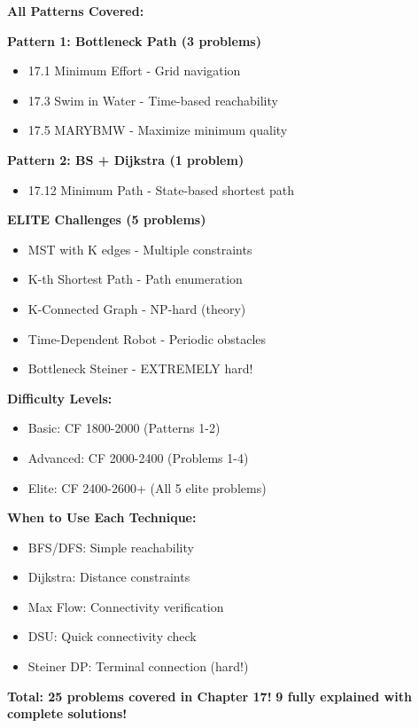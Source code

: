 \documentclass[11pt,a4paper,oneside]{book}
\begin{document}
\begin{tcolorbox}[
    enhanced,breakable,
    colback=primaryblue!10,
    colframe=primaryblue,
    boxrule=2pt,
    arc=4mm,
    title=\textbf{Binary Search on Graphs: Complete Mastery}
]
\textbf{All Patterns Covered:}

\textbf{Pattern 1: Bottleneck Path (3 problems)}
\begin{itemize}
\item 17.1 Minimum Effort - Grid navigation
\item 17.3 Swim in Water - Time-based reachability
\item 17.5 MARYBMW - Maximize minimum quality
\end{itemize}

\textbf{Pattern 2: BS + Dijkstra (1 problem)}
\begin{itemize}
\item 17.12 Minimum Path - State-based shortest path
\end{itemize}

\textbf{ELITE Challenges (5 problems)}
\begin{itemize}
\item MST with K edges - Multiple constraints
\item K-th Shortest Path - Path enumeration
\item K-Connected Graph - NP-hard (theory)
\item Time-Dependent Robot - Periodic obstacles
\item Bottleneck Steiner - EXTREMELY hard!
\end{itemize}

\textbf{Difficulty Levels:}
\begin{itemize}
\item Basic: CF 1800-2000 (Patterns 1-2)
\item Advanced: CF 2000-2400 (Problems 1-4)
\item Elite: CF 2400-2600+ (All 5 elite problems)
\end{itemize}

\textbf{When to Use Each Technique:}
\begin{itemize}
\item BFS/DFS: Simple reachability
\item Dijkstra: Distance constraints
\item Max Flow: Connectivity verification
\item DSU: Quick connectivity check
\item Steiner DP: Terminal connection (hard!)
\end{itemize}

\textbf{Total: 25 problems covered in Chapter 17!}
\textbf{9 fully explained with complete solutions!}
\end{tcolorbox}
\end{document}
